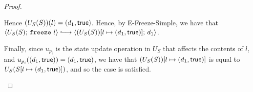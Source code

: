 \begin{proof}
\begin{itemize}
      Hence $(U_S(S))(l) = (d_1, \textsf{true})$.  Hence, by {\sc
        E-Freeze-Simple}, we have that $\config{U_S(S)}{\freeze{l}}
      \parstepsto \config{\extS{(U_S(S))}{l}{d_1}{\frozentrue}}{d_1}$.

      Finally, since $u_{p_i}$ is the state update operation in $U_S$
      that affects the contents of $l$, and
      $u_{p_i}((d_1, \textsf{true})) = (d_1, \textsf{true})$,
      we have that $(U_S(S))[l \mapsto (d_1, \textsf{true})]$ is equal to
      $U_S(S[l \mapsto (d_1, \textsf{true})])$, and so the case is
      satisfied.

  \end{itemize}
\end{proof}
